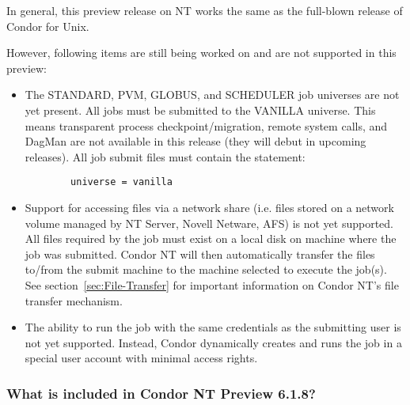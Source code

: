 In general, this preview release on NT works the same as the full-blown
release of Condor for Unix.  

However,
following items are still being worked on and are not supported in this
preview:

\begin{itemize}

\item The STANDARD, PVM, GLOBUS, and SCHEDULER job universes are not yet present.
All jobs must be submitted to the VANILLA universe.
This means transparent process checkpoint/migration, remote system calls,
and DagMan are not available in this release (they will debut in
upcoming releases).  All job submit files must contain the statement:
\begin{verbatim}
        universe = vanilla
\end{verbatim}

\item Support for accessing files via a network share (i.e. files stored on
a network volume managed by NT Server, Novell Netware, AFS) is not yet
supported.  All files required by the job must exist on a local disk on
machine where the job was submitted.  Condor NT will then automatically
transfer the files to/from the submit machine to the machine selected to
execute the job(s).  See section~\ref{sec:File-Transfer} for important
information on Condor NT's file transfer mechanism.

\item The ability to run the job with the same credentials as the submitting
user is not yet supported.  Instead, Condor dynamically creates and runs the
job in a special user account with minimal access rights.

\end{itemize}

\subsubsection{What is included in Condor NT Preview 6.1.8?}

